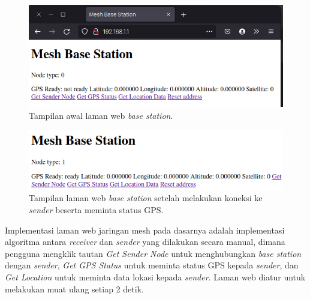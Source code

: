 \begin{figure}[H]
	\centering
	\includegraphics[scale=0.5]{./assets/RealisasiSistem/BaseStation/TampilanWebPageAwal}
	\caption{Tampilan awal laman web \textit{base station}.}
\end{figure}
\begin{figure}[H]
	\centering
	\includegraphics[scale=0.5]{./assets/RealisasiSistem/BaseStation/TampilanWebPageGPSReady}
	\caption{Tampilan laman web \textit{base station} setelah melakukan koneksi ke \textit{sender} beserta meminta status GPS.}
\end{figure}
Implementasi laman web jaringan mesh pada dasarnya adalah implementasi algoritma antara \textit{receiver} dan \textit{sender} yang dilakukan secara manual, dimana pengguna mengklik tautan \textit{Get Sender Node} untuk menghubungkan \textit{base station} dengan \textit{sender}, \textit{Get GPS Status} untuk meminta status GPS kepada \textit{sender}, dan \textit{Get Location} untuk meminta data lokasi kepada \textit{sender}. Laman web diatur untuk melakukan muat ulang setiap 2 detik.
